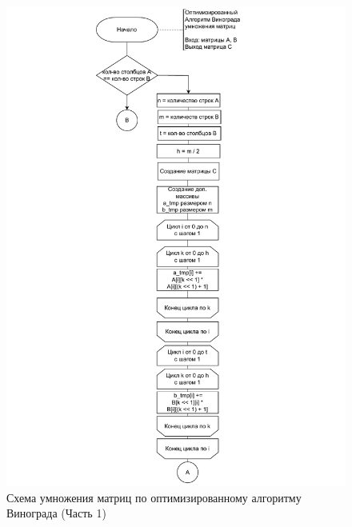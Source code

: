 \begin{figure}[h]
	\centering
	\includegraphics[width=1\linewidth]{img/vinograd_opt_alg_1.pdf}
	\caption{Схема умножения матриц по оптимизированному алгоритму Винограда (Часть 1)}
	\label{img:vinograd_opt_alg_1}
\end{figure}

